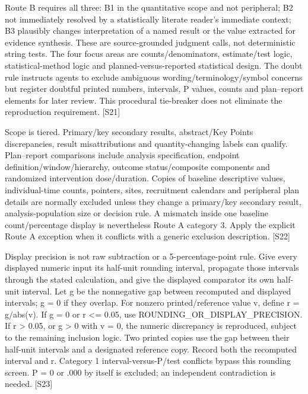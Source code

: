 \documentclass[10pt,a4paper]{article}
\begin{document}
Route B requires all three: B1 in the quantitative scope and not peripheral; B2 not immediately resolved by a statistically literate reader's immediate context; B3 plausibly changes interpretation of a named result or the value extracted for evidence synthesis.\allowbreak{} These are source-\allowbreak{}grounded judgment calls, not deterministic string tests.\allowbreak{} The four focus areas are counts/\allowbreak{}denominators, estimate/\allowbreak{}test logic, statistical-\allowbreak{}method logic and planned-\allowbreak{}versus-\allowbreak{}reported statistical design.\allowbreak{} The doubt rule instructs agents to exclude ambiguous wording/\allowbreak{}terminology/\allowbreak{}symbol concerns but register doubtful printed numbers, intervals, P values, counts and plan–report elements for later review.\allowbreak{} This procedural tie-\allowbreak{}breaker does not eliminate the reproduction requirement.\allowbreak{} [S21]\par
Scope is tiered.\allowbreak{} Primary/\allowbreak{}key secondary results, abstract/\allowbreak{}Key Points discrepancies, result misattributions and quantity-\allowbreak{}changing labels can qualify.\allowbreak{} Plan–report comparisons include analysis specification, endpoint definition/\allowbreak{}window/\allowbreak{}hierarchy, outcome status/\allowbreak{}composite components and randomized intervention dose/\allowbreak{}duration.\allowbreak{} Copies of baseline descriptive values, individual-\allowbreak{}time counts, pointers, sites, recruitment calendars and peripheral plan details are normally excluded unless they change a primary/\allowbreak{}key secondary result, analysis-\allowbreak{}population size or decision rule.\allowbreak{} A mismatch inside one baseline count/\allowbreak{}percentage display is nevertheless Route A category 3.\allowbreak{} Apply the explicit Route A exception when it conflicts with a generic exclusion description.\allowbreak{} [S22]\par
Display precision is not raw subtraction or a 5-\allowbreak{}percentage-\allowbreak{}point rule.\allowbreak{} Give every displayed numeric input its half-\allowbreak{}unit rounding interval, propagate those intervals through the stated calculation, and give the displayed comparator its own half-\allowbreak{}unit interval.\allowbreak{} Let g be the nonnegative gap between recomputed and displayed intervals; g = 0 if they overlap.\allowbreak{} For nonzero printed/\allowbreak{}reference value v, define r = g/\allowbreak{}abs(v).\allowbreak{} If g = 0 or r <= 0.\allowbreak{}05, use ROUNDING\_\allowbreak{}OR\_\allowbreak{}DISPLAY\_\allowbreak{}PRECISION.\allowbreak{} If r > 0.\allowbreak{}05, or g > 0 with v = 0, the numeric discrepancy is reproduced, subject to the remaining inclusion logic.\allowbreak{} Two printed copies use the gap between their half-\allowbreak{}unit intervals and a designated reference copy.\allowbreak{} Record both the recomputed interval and r.\allowbreak{} Category 1 interval-\allowbreak{}versus-\allowbreak{}P/\allowbreak{}test conflicts bypass this rounding screen.\allowbreak{} P = 0 or .\allowbreak{}000 by itself is excluded; an independent contradiction is needed.\allowbreak{} [S23]\par
\end{document}
